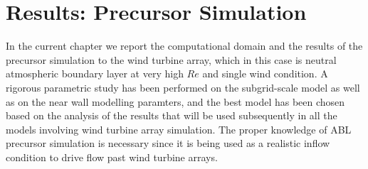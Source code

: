 
\chapter{Results: Precursor Simulation} %

\label{Chapter3} %

In the current chapter we report the computational domain and the results of the precursor simulation to the wind turbine array, which in this case is neutral atmospheric boundary layer at very high $Re$ and single wind condition. A rigorous parametric study has been performed on the subgrid-scale model as well as on the near wall modelling paramters, and the best model has been chosen based on the analysis of the results that will be used subsequently in all the models involving wind turbine array simulation. The proper knowledge of ABL precursor simulation is necessary since it is being used as a realistic inflow condition to drive flow past wind turbine arrays. 
